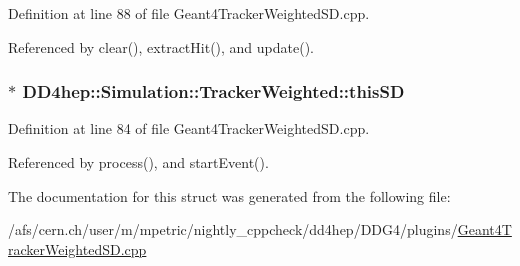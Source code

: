 Definition at line 88 of file Geant4TrackerWeightedSD.cpp.

Referenced by clear(), extractHit(), and update().\hypertarget{struct_d_d4hep_1_1_simulation_1_1_tracker_weighted_a75a27a45aa4197181191c68eb92f9863}{
\subsubsection[{thisSD}]{$\ast$ {\bf DD4hep::Simulation::TrackerWeighted::thisSD}}}
\label{struct_d_d4hep_1_1_simulation_1_1_tracker_weighted_a75a27a45aa4197181191c68eb92f9863}


Definition at line 84 of file Geant4TrackerWeightedSD.cpp.

Referenced by process(), and startEvent().

The documentation for this struct was generated from the following file:\begin{DoxyCompactItemize}
\item 
/afs/cern.ch/user/m/mpetric/nightly\_\-cppcheck/dd4hep/DDG4/plugins/\hyperlink{_geant4_tracker_weighted_s_d_8cpp}{Geant4TrackerWeightedSD.cpp}\end{DoxyCompactItemize}
